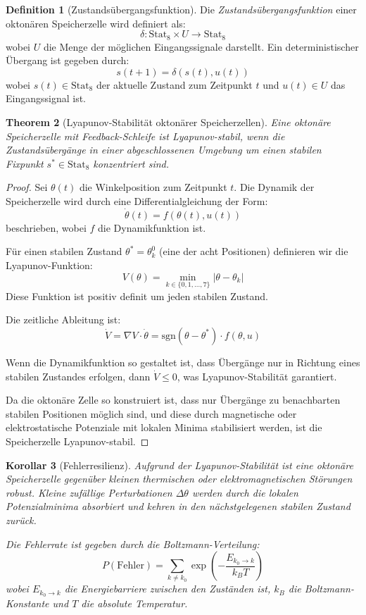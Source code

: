\documentclass[12pt, a4paper]{article}
\newtheorem{theorem}{Theorem}[section]
\newtheorem{corollary}[theorem]{Korollar}
\theoremstyle{definition}
\newtheorem{definition}[theorem]{Definition}
\theoremstyle{remark}
\newcommand{\Stat}{\mathrm{Stat}}
\begin{document}
\begin{definition}[Zustandsübergangsfunktion]
\label{def:uebergangsfunktion_oktonaer}
Die \emph{Zustandsübergangsfunktion} einer oktonären Speicherzelle wird definiert als:
\[
\delta: \Stat_8 \times U \to \Stat_8
\]
wobei $U$ die Menge der möglichen Eingangssignale darstellt. Ein deterministischer Übergang ist gegeben durch:
\[
s(t+1) = \delta(s(t), u(t))
\]
wobei $s(t) \in \Stat_8$ der aktuelle Zustand zum Zeitpunkt $t$ und $u(t) \in U$ das Eingangssignal ist.
\end{definition}

\begin{theorem}[Lyapunov-Stabilität oktonärer Speicherzellen]
\label{thm:lyapunov_oktonaer}
Eine oktonäre Speicherzelle mit Feedback-Schleife ist Lyapunov-stabil, wenn die Zustandsübergänge in einer abgeschlossenen Umgebung um einen stabilen Fixpunkt $s^* \in \Stat_8$ konzentriert sind.
\end{theorem}

\begin{proof}
Sei $\theta(t)$ die Winkelposition zum Zeitpunkt $t$. Die Dynamik der Speicherzelle wird durch eine Differentialgleichung der Form:
\[
\dot{\theta}(t) = f(\theta(t), u(t))
\]
beschrieben, wobei $f$ die Dynamikfunktion ist.

Für einen stabilen Zustand $\theta^* = \theta_k^0$ (eine der acht Positionen) definieren wir die Lyapunov-Funktion:
\[
V(\theta) = \min_{k \in \{0,1,\ldots,7\}} |\theta - \theta_k|
\]
Diese Funktion ist positiv definit um jeden stabilen Zustand.

Die zeitliche Ableitung ist:
\[
\dot{V} = \nabla V \cdot \dot{\theta} = \text{sgn}(\theta - \theta^*) \cdot f(\theta, u)
\]

Wenn die Dynamikfunktion so gestaltet ist, dass Übergänge nur in Richtung eines stabilen Zustandes erfolgen, dann $\dot{V} \leq 0$, was Lyapunov-Stabilität garantiert.

Da die oktonäre Zelle so konstruiert ist, dass nur Übergänge zu benachbarten stabilen Positionen möglich sind, und diese durch magnetische oder elektrostatische Potenziale mit lokalen Minima stabilisiert werden, ist die Speicherzelle Lyapunov-stabil.
\end{proof}

\begin{corollary}[Fehlerresilienz]
\label{cor:fehlerresilienz_oktonaer}
Aufgrund der Lyapunov-Stabilität ist eine oktonäre Speicherzelle gegenüber kleinen thermischen oder elektromagnetischen Störungen robust. Kleine zufällige Perturbationen $\Delta\theta$ werden durch die lokalen Potenzialminima absorbiert und kehren in den nächstgelegenen stabilen Zustand zurück.

Die Fehlerrate ist gegeben durch die Boltzmann-Verteilung:
\[
P(\text{Fehler}) = \sum_{k \neq k_0} \exp\left(-\frac{E_{k_0 \to k}}{k_B T}\right)
\]
wobei $E_{k_0 \to k}$ die Energiebarriere zwischen den Zuständen ist, $k_B$ die Boltzmann-Konstante und $T$ die absolute Temperatur.
\end{corollary}
\end{document}
